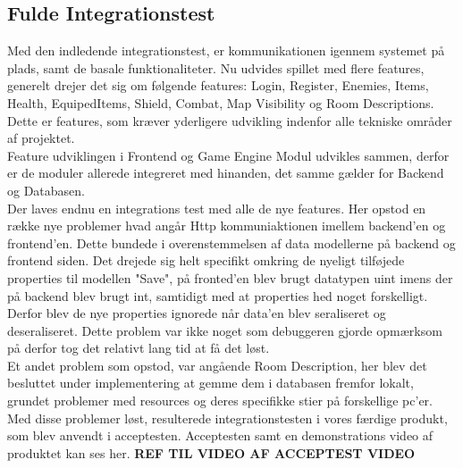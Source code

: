 
\subsection{Fulde Integrationstest}

Med den indledende integrationstest, er kommunikationen igennem systemet på plads, samt de basale funktionaliteter. Nu udvides spillet med flere features, generelt drejer det sig om følgende features: Login, Register, Enemies, Items, Health, EquipedItems, Shield, Combat, Map Visibility og Room Descriptions. Dette er features, som kræver yderligere udvikling indenfor alle tekniske områder af projektet.\\


Feature udviklingen i Frontend og Game Engine Modul udvikles sammen, derfor er de moduler allerede integreret med hinanden, det samme gælder for Backend og Databasen.\\

Der laves endnu en integrations test med alle de nye features. Her opstod en række nye problemer hvad angår Http kommuniaktionen imellem backend'en og frontend'en. Dette bundede i overenstemmelsen af data modellerne på backend og frontend siden. Det drejede sig helt specifikt omkring de nyeligt tilføjede properties til modellen "Save", på fronted'en blev brugt datatypen uint imens der på backend blev brugt int, samtidigt med at properties hed noget forskelligt. Derfor blev de nye properties ignorede når data'en blev seraliseret og deseraliseret. Dette problem var ikke noget som debuggeren gjorde opmærksom på derfor tog det relativt lang tid at få det løst.\\

Et andet problem som opstod, var angående Room Description, her blev det besluttet under implementering at gemme dem i databasen fremfor lokalt, grundet problemer med resources og deres specifikke stier på forskellige pc'er.\\

Med disse problemer løst, resulterede integrationstesten i vores færdige produkt, som blev anvendt i acceptesten. Acceptesten samt en demonstrations video af produktet kan ses her. \textbf{REF TIL VIDEO AF ACCEPTEST VIDEO}\\    
 

  

